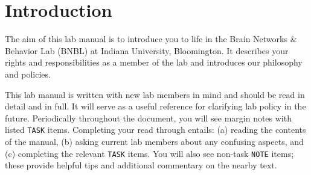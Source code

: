 \documentclass{tufte-book} %
\begin{document}







\newcommand{\director}{Rick}
\newcommand{\coordinator}{Rick}
\newcommand{\labmeetingtime}{Fridays at 12:30pm}

\cleardoublepage
\chapter{Introduction}\label{ch:intro} %

The aim of this lab manual is to introduce you to life in the Brain Networks \& Behavior Lab (BNBL) at Indiana University, Bloomington. It describes your rights and responsibilities as a member of the lab and introduces our philosophy and policies.



This lab manual is written with new lab members in mind and should be read in detail and in full. It will serve as a useful reference for clarifying lab policy in the future. Periodically throughout the document, you will see margin notes with listed \texttt{TASK} items. Completing your read through entails: (a) reading the contents of the manual, (b) asking current lab members about any confusing aspects, and (c) completing the relevant \texttt{TASK} items. You will also see non-task \texttt{NOTE} items; these provide helpful tips and additional commentary on the nearby text.
\end{document}
